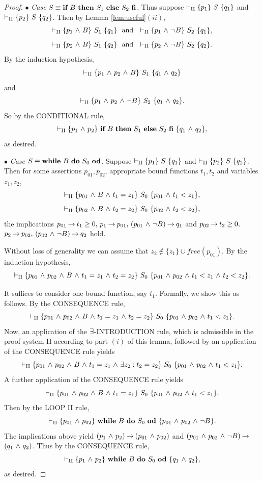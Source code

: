 \documentclass[runningheads]{llncs}       %
\begin{document}
\begin{proof}
\III

\NI
$\bullet$ \emph{Case} $S \equiv \ITE{B}{S_1}{S_2}$.
Thus suppose $\vdash_{\rm{II}} \HT{p_1}{S}{q_1}$ and
$\vdash_{\rm{II}} \HT{p_2}{S}{q_2}$.
Then by Lemma \ref{lem:useful}$(ii)$,
\[
 \vdash_{\rm{II}} \HT{p_{1}\A B}{S_1}{q_{1}} \ \mbox{ and }\
 \vdash_{\rm{II}} \HT{p_{1}\A \neg B}{S_2}{q_{1}},
\]
\[
 \vdash_{\rm{II}} \HT{p_{2} \A B}{S_1}{q_{2}} \ \mbox{ and }\
 \vdash_{\rm{II}} \HT{p_{2} \A \neg B}{S_2}{q_{2}}.
\]
By the induction hypothesis,
\[
 \vdash_{\rm{II}} \HT{p_{1}\A p_{2} \A B}{S_1}{q_{1} \A q_{2}}
\]
and
\[
 \vdash_{\rm{II}} \HT{p_{1}\A p_{2} \A \neg B}{S_2}{q_{1} \A q_{2}}.
\]
So by the CONDITIONAL rule,
\[
  \vdash_{\rm{II}} \HT{p_1 \A p_2}{\ITE{B}{S_1}{S_2}}{q_1 \A q_2},
\]
as desired.

\III

\NI
$\bullet$ \emph{Case} $S \equiv \WDD{B}{S_0}$.
Suppose $\vdash_{\rm{II}} \HT{p_1}{S}{q_1}$ and
$\vdash_{\rm{II}} \HT{p_2}{S}{q_2}$.
Then for some assertions $p_{01},p_{02}$, appropriate bound functions $t_1, t_2$ and
variables $z_1, z_2$,
\[
 \vdash_{\rm{II}} \HT{p_{01} \A B \A t_1 = z_1}{S_0}{p_{01} \A t_1 < z_1},
\]
\[
 \vdash_{\rm{II}} \HT{p_{02} \A B \A t_2 = z_2}{S_0}{p_{02} \A t_2 < z_2},
\]
the implications
$p_{01} \ra t_1 \ge 0, \, p_1 \ra p_{01}, \, (p_{01} \A \neg B) \ra q_1$
and
$p_{02} \ra t_2 \ge 0,$ $p_2 \ra p_{02}, \, (p_{02} \A \neg B) \ra q_2$
hold.

Without loss of generality we can assume that $z_2 \not \in \{z_1\} \cup \mathit{free}(p_{01})$.
By the induction hypothesis,
\[
 \vdash_{\rm{II}} \HT{p_{01} \A p_{02} \A B \A t_1 = z_1 \A t_2 = z_2}{S_0}
                     {p_{01} \A p_{02} \A t_1 < z_1 \A t_2 < z_2}.
\]

It suffices to consider one bound function, say $t_1$.
Formally, we show this as follows.
By the CONSEQUENCE rule,
\[
 \vdash_{\rm{II}} \HT{p_{01} \A p_{02} \A B \A t_1 = z_1 \A t_2 = z_2}{S_0}
                     {p_{01} \A p_{02} \A t_1 < z_1}.
\]
Now, an application of the $\te$-INTRODUCTION rule, which is admissible
in the proof system II according to part $(i)$ of this lemma, followed by an application
of the CONSEQUENCE rule yields
\[
 \vdash_{\rm{II}} \HT{p_{01} \A p_{02} \A B \A t_1 = z_1 \A \te z_2: t_2 = z_2}{S_0}
                     {p_{01} \A p_{02} \A t_1 < z_1}.
\]
A further application of the CONSEQUENCE rule yields
\[
 \vdash_{\rm{II}} \HT{p_{01} \A p_{02} \A B \A t_1 = z_1}{S_0}
                     {p_{01} \A p_{02} \A t_1 < z_1}.
\]
Then by the LOOP II rule,
\[
  \vdash_{\rm{II}} \HT{p_{01} \A p_{02}}{\WDD{B}{S_0}}{p_{01} \A p_{02} \A \neg B}.
\]
The implications above yield
$(p_1 \A p_2) \ra (p_{01} \A p_{02})$ and
$(p_{01} \A p_{02} \A \neg B) \ra$ $(q_1 \A q_2)$.
Thus by the CONSEQUENCE rule,
\[
 \vdash_{\rm{II}} \HT{p_1 \A p_2}{\WDD{B}{S_0}}{q_1 \A q_2},
\]
as desired.
\III


\end{proof}
\end{document}
